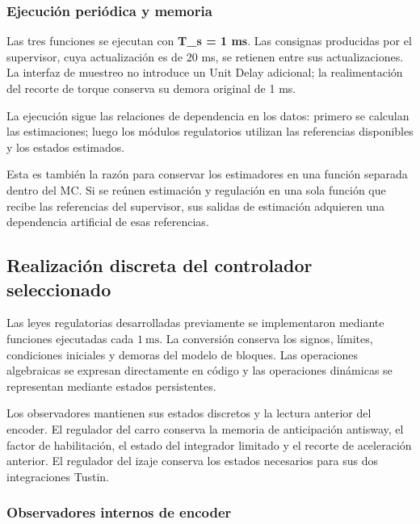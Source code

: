\documentclass[a4paper,10pt,onecolumn,journal]{ieeeconf}
\numberwithin{equation}{section}
\begin{document}

\subsubsection{Ejecución periódica y memoria}

Las tres funciones se ejecutan con \textbf{T\_s = 1 ms}. Las consignas producidas por el supervisor, cuya actualización es de 20 ms, se retienen entre sus actualizaciones. La interfaz de muestreo no introduce un Unit Delay adicional; la realimentación del recorte de torque conserva su demora original de 1 ms.

La ejecución sigue las relaciones de dependencia en los datos: primero se calculan las estimaciones; luego los módulos regulatorios utilizan las referencias disponibles y los estados estimados.

Esta es también la razón para conservar los estimadores en una función separada dentro del MC. Si se reúnen estimación y regulación en una sola función que recibe las referencias del supervisor, sus salidas de estimación adquieren una dependencia artificial de esas referencias.


\subsection{Realización discreta del controlador seleccionado}

Las leyes regulatorias desarrolladas previamente se implementaron mediante funciones ejecutadas cada $1~\mathrm{ms}$. La conversión conserva los signos, límites, condiciones iniciales y demoras del modelo de bloques. Las operaciones algebraicas se expresan directamente en código y las operaciones dinámicas se representan mediante estados persistentes.

Los observadores mantienen sus estados discretos y la lectura anterior del encoder. El regulador del carro conserva la memoria de anticipación antisway, el factor de habilitación, el estado del integrador limitado y el recorte de aceleración anterior. El regulador del izaje conserva los estados necesarios para sus dos integraciones Tustin.

\subsubsection{Observadores internos de encoder}
\end{document}
